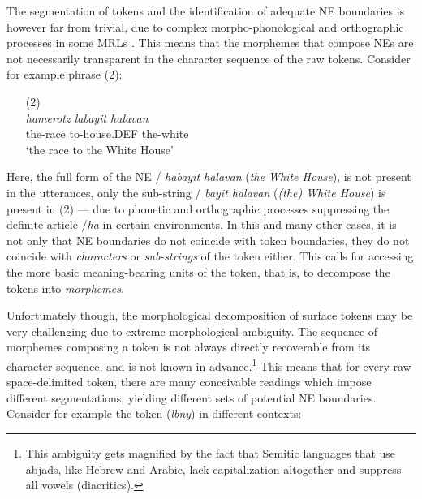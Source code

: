\documentclass[11pt,a4paper]{article}
\begin{document}
The segmentation of tokens  and the identification of adequate NE boundaries is however far from trivial, due to 
complex morpho-phonological and orthographic processes in some MRLs   \cite{vania-etal-2018-character,klein-tsarfaty-2020-getting}.
This means that the morphemes that compose  NEs are not necessarily transparent in the character sequence of the raw  tokens. Consider for example   phrase  (2):
\begin{itemize}
    \item[(2)] 
    \\ {\em hamerotz  \hspace{0.6cm} labayit  \hspace{1.2cm} halavan}
    \\ {\small the-race \hspace{0.9cm} to-house.DEF \hspace{0.3cm} the-white}
    \\ `the race to the White House'
\end{itemize} 
Here, the full form of the NE  / \emph{habayit halavan}  (\emph{the White House}), is not present in the utterances, only the sub-string  / \emph{bayit halavan}  (\emph{(the) White House})  
is present in (2) --- due to  phonetic and orthographic processes suppressing  the definite article /\emph{ha} in certain environments.
In this and many other cases, it is not only that NE boundaries do not coincide with token boundaries,  they do not coincide with  {\em characters} or {\em sub-strings} of the token either. This calls for accessing the more basic meaning-bearing  units of the token,   that is, to decompose the tokens into  \emph{morphemes}. 

 Unfortunately though, the morphological decomposition of surface tokens may be very  challenging due  to extreme morphological ambiguity.  
The sequence of morphemes composing a token is not always directly recoverable from its character sequence, and is not known in advance.\footnote{This ambiguity gets  magnified by the fact that Semitic languages that use abjads, like Hebrew and Arabic, lack capitalization altogether and  suppress all vowels (diacritics).} This means that for every raw space-delimited token, there are many conceivable readings which impose different segmentations, yielding different sets of potential NE boundaries.
Consider for example the token  (\emph{lbny}) in   different contexts:
\end{document}
